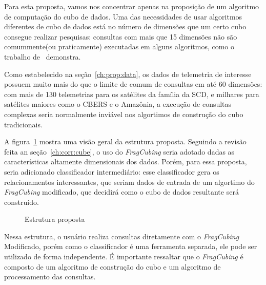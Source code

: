 {\color{cerulean}
Para esta proposta, vamos nos concentrar apenas na proposição de um algoritmo de computação do cubo de dados.
Uma das necessidades de usar algoritmos diferentes de cubo de dados está no número de dimensões que um certo cubo consegue realizar pesquisas: consultas com mais que 15 dimensões não são comummente(ou praticamente) executadas em alguns algoritmos, como o trabalho de~ demonstra.

Como estabelecido na seção~\ref{ch:prop:data}, os dados de telemetria de interesse possuem muito mais do que o limite de comum de consultas em até 60 dimensões: com mais de 130 telemetrias para os satélites da família da SCD, e milhares para satélites maiores como o CBERS e o Amazônia, a execução de consultas complexas seria normalmente inviável nos algortimos de construção do cubo tradicionais.

A figura~\ref{fig:qualistructure} mostra uma visão geral da estrutura proposta.
Seguindo a revisão feita an seção~\ref{ch:corr:cube}, o uso do \textit{FragCubing} seria adotado dadas as características altamente dimensionais dos dados.
Porém, para essa proposta, seria adicionado classificador intermediário: esse classificador gera os relacionamentos interessantes, que seriam dados de entrada de um algortimo do \textit{FragCubing} modificado, que decidirá como o cubo de dados resultante será construído.

\begin{figure}[!htb]
	\caption{Estrutura proposta}\label{fig:qualistructure}
	\vspace{2mm}
	\begin{center}
	\end{center}
	\vspace{1mm}
	\legenda{}
\end{figure}

Nessa estrutura, o usuário realiza consultas diretamente com o \textit{FragCubing} Modificado, porém como o classificador é uma ferramenta separada, ele pode ser utilizado de forma independente.
É importante ressaltar que o \textit{FragCubing} é composto de um algoritmo de construção do cubo e um algoritmo de processamento das consultas.

}
